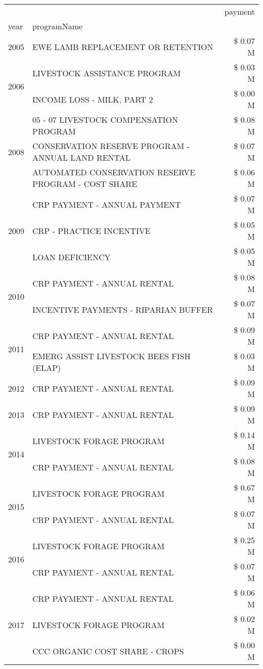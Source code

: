 \begin{tabular}{llr}
\toprule
 &  & payment \\
year & programName &  \\
\midrule
2005 & EWE LAMB REPLACEMENT OR RETENTION & \$ 0.07 M \\
\cline{1-3}
\multirow[t]{2}{*}{2006} & LIVESTOCK ASSISTANCE PROGRAM & \$ 0.03 M \\
 & INCOME LOSS - MILK, PART 2 & \$ 0.00 M \\
\cline{1-3}
\multirow[t]{3}{*}{2008} & 05 - 07 LIVESTOCK COMPENSATION PROGRAM & \$ 0.08 M \\
 & CONSERVATION RESERVE PROGRAM - ANNUAL LAND RENTAL & \$ 0.07 M \\
 & AUTOMATED CONSERVATION RESERVE PROGRAM - COST SHARE & \$ 0.06 M \\
\cline{1-3}
\multirow[t]{3}{*}{2009} & CRP PAYMENT - ANNUAL PAYMENT & \$ 0.07 M \\
 & CRP - PRACTICE INCENTIVE & \$ 0.05 M \\
 & LOAN DEFICIENCY & \$ 0.05 M \\
\cline{1-3}
\multirow[t]{2}{*}{2010} & CRP PAYMENT - ANNUAL RENTAL & \$ 0.08 M \\
 & INCENTIVE PAYMENTS - RIPARIAN BUFFER & \$ 0.07 M \\
\cline{1-3}
\multirow[t]{2}{*}{2011} & CRP PAYMENT - ANNUAL RENTAL & \$ 0.09 M \\
 & EMERG ASSIST LIVESTOCK BEES FISH (ELAP) & \$ 0.03 M \\
\cline{1-3}
2012 & CRP PAYMENT - ANNUAL RENTAL & \$ 0.09 M \\
\cline{1-3}
2013 & CRP PAYMENT - ANNUAL RENTAL & \$ 0.09 M \\
\cline{1-3}
\multirow[t]{2}{*}{2014} & LIVESTOCK FORAGE PROGRAM & \$ 0.14 M \\
 & CRP PAYMENT - ANNUAL RENTAL & \$ 0.08 M \\
\cline{1-3}
\multirow[t]{2}{*}{2015} & LIVESTOCK FORAGE PROGRAM & \$ 0.67 M \\
 & CRP PAYMENT - ANNUAL RENTAL & \$ 0.07 M \\
\cline{1-3}
\multirow[t]{2}{*}{2016} & LIVESTOCK FORAGE PROGRAM & \$ 0.25 M \\
 & CRP PAYMENT - ANNUAL RENTAL & \$ 0.07 M \\
\cline{1-3}
\multirow[t]{3}{*}{2017} & CRP PAYMENT - ANNUAL RENTAL & \$ 0.06 M \\
 & LIVESTOCK FORAGE PROGRAM & \$ 0.02 M \\
 & CCC ORGANIC COST SHARE - CROPS & \$ 0.00 M \\

\end{tabular}
